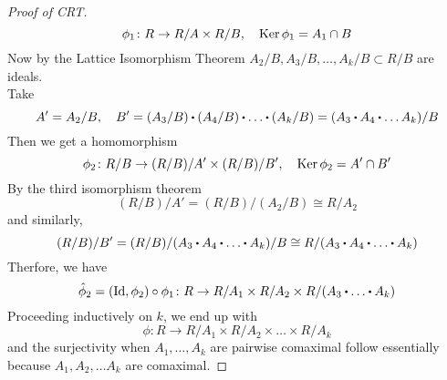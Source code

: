 \documentclass[../Main.tex]{subfiles}
\begin{document}
\begin{proof}[Proof of CRT]
	\[\phi_1 \colon R\to R/A\times R/B, \quad \operatorname{Ker}\phi_1=A_1\cap B \]
	Now by the Lattice Isomorphism Theorem $A_2/B,A_3/B,\dots,A_k/B\subset R/B$ are ideals.\\
	Take 
	\[A'=A_2/B,\quad B' = (A_3/B)\rdot (A_4/B)\rdot \dots \rdot (A_k/B) = (A_3\rdot A_4\rdot \dots A_k)/B\]
	Then we get a homomorphism
	\[\phi_2\colon R/B\to (R/B)/A' \times (R/B)/B', \quad \operatorname{Ker} \phi_2 = A'\cap B'\]
	By the third isomorphism theorem 
	\[(R/B)/A'=(R/B)/(A_2/B)\cong R/A_2\]
	and similarly,
	\[(R/B)/B'=(R/B)/(A_3\rdot A_4\rdot \dots \rdot A_k)/B\cong R/(A_3\rdot A_4\rdot \dots \rdot A_k)\]
	Therfore, we have 
	\[\hat{\phi}_2=(\mathrm{Id},\phi_2)\circ \phi_1\colon R\to R/A_1\times R/A_2\times R/(A_3\rdot \dots\rdot A_k) \]
	Proceeding inductively on $k$, we end up with
	\[\phi\colon R\to R/A_1\times R/A_2\times \dots \times R/A_k\]
	and the surjectivity when $A_1,\dots,A_k$ are pairwise comaximal follow essentially because $A_1,A_2,\dots A_k$ are comaximal.
\end{proof}
\end{document}
